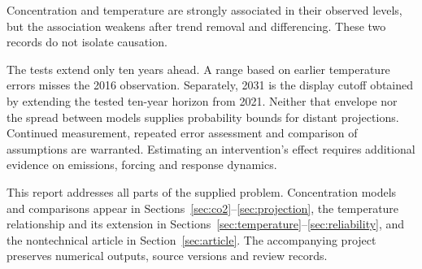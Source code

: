 \documentclass[11pt,a4paper]{article}
\newcommand{\p}[2]{#2\par}
\begin{document}
\p{SUM06}{Concentration and temperature are strongly associated in their observed levels, but the association weakens after trend removal and differencing. These two records do not isolate causation.}
\p{SUM05}{The tests extend only ten years ahead. A range based on earlier temperature errors misses the 2016 observation. Separately, 2031 is the display cutoff obtained by extending the tested ten-year horizon from 2021. Neither that envelope nor the spread between models supplies probability bounds for distant projections. Continued measurement, repeated error assessment and comparison of assumptions are warranted. Estimating an intervention's effect requires additional evidence on emissions, forcing and response dynamics.}
\clearpage
\tableofcontents
\vfill
\p{CONT01}{This report addresses all parts of the supplied problem. Concentration models and comparisons appear in Sections~\ref{sec:co2}--\ref{sec:projection}, the temperature relationship and its extension in Sections~\ref{sec:temperature}--\ref{sec:reliability}, and the nontechnical article in Section~\ref{sec:article}. The accompanying project preserves numerical outputs, source versions and review records.}
\clearpage
\end{document}
